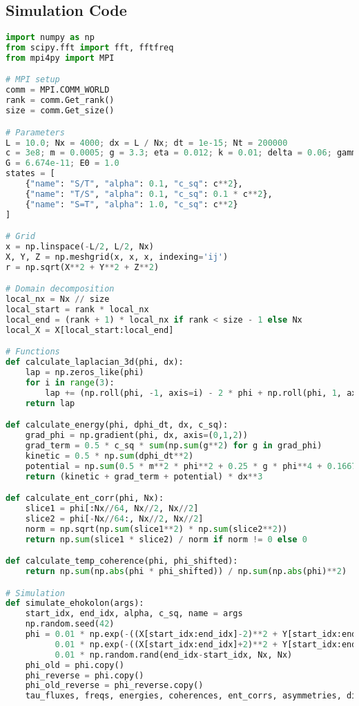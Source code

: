 \documentclass[11pt]{article}
\begin{document}
\subsection{Simulation Code}
\begin{lstlisting}[language=Python, caption={Fluxonic Time Evolution Simulation}, label=lst:time]
import numpy as np
from scipy.fft import fft, fftfreq
from mpi4py import MPI

# MPI setup
comm = MPI.COMM_WORLD
rank = comm.Get_rank()
size = comm.Get_size()

# Parameters
L = 10.0; Nx = 4000; dx = L / Nx; dt = 1e-15; Nt = 200000
c = 3e8; m = 0.0005; g = 3.3; eta = 0.012; k = 0.01; delta = 0.06; gamma = 0.0225
G = 6.674e-11; E0 = 1.0
states = [
    {"name": "S/T", "alpha": 0.1, "c_sq": c**2},
    {"name": "T/S", "alpha": 0.1, "c_sq": 0.1 * c**2},
    {"name": "S=T", "alpha": 1.0, "c_sq": c**2}
]

# Grid
x = np.linspace(-L/2, L/2, Nx)
X, Y, Z = np.meshgrid(x, x, x, indexing='ij')
r = np.sqrt(X**2 + Y**2 + Z**2)

# Domain decomposition
local_nx = Nx // size
local_start = rank * local_nx
local_end = (rank + 1) * local_nx if rank < size - 1 else Nx
local_X = X[local_start:local_end]

# Functions
def calculate_laplacian_3d(phi, dx):
    lap = np.zeros_like(phi)
    for i in range(3):
        lap += (np.roll(phi, -1, axis=i) - 2 * phi + np.roll(phi, 1, axis=i)) / dx**2
    return lap

def calculate_energy(phi, dphi_dt, dx, c_sq):
    grad_phi = np.gradient(phi, dx, axis=(0,1,2))
    grad_term = 0.5 * c_sq * sum(np.sum(g**2) for g in grad_phi)
    kinetic = 0.5 * np.sum(dphi_dt**2)
    potential = np.sum(0.5 * m**2 * phi**2 + 0.25 * g * phi**4 + 0.1667 * eta * phi**6)
    return (kinetic + grad_term + potential) * dx**3

def calculate_ent_corr(phi, Nx):
    slice1 = phi[:Nx//64, Nx//2, Nx//2]
    slice2 = phi[-Nx//64:, Nx//2, Nx//2]
    norm = np.sqrt(np.sum(slice1**2) * np.sum(slice2**2))
    return np.sum(slice1 * slice2) / norm if norm != 0 else 0

def calculate_temp_coherence(phi, phi_shifted):
    return np.sum(np.abs(phi * phi_shifted)) / np.sum(np.abs(phi)**2)

# Simulation
def simulate_ehokolon(args):
    start_idx, end_idx, alpha, c_sq, name = args
    np.random.seed(42)
    phi = 0.01 * np.exp(-((X[start_idx:end_idx]-2)**2 + Y[start_idx:end_idx]**2 + Z[start_idx:end_idx]**2)/0.1**2) * np.cos(5*X[start_idx:end_idx]) + \
          0.01 * np.exp(-((X[start_idx:end_idx]+2)**2 + Y[start_idx:end_idx]**2 + Z[start_idx:end_idx]**2)/0.1**2) * np.cos(5*X[start_idx:end_idx]) + \
          0.01 * np.random.rand(end_idx-start_idx, Nx, Nx)
    phi_old = phi.copy()
    phi_reverse = phi.copy()
    phi_old_reverse = phi_reverse.copy()
    tau_fluxes, freqs, energies, coherences, ent_corrs, asymmetries, dil_grads = [], [], [], [], [], [], []
    

\end{lstlisting}
\end{document}
